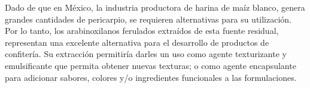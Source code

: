 Dado de que en México, la industria productora de harina de maíz blanco, genera grandes cantidades de pericarpio, se requieren alternativas para su utilización. Por lo tanto, los arabinoxilanos ferulados extraídos de esta fuente residual, representan una excelente alternativa para el desarrollo de productos de confitería. Su extracción permitiría darles un uso como agente texturizante y emulsificante que permita obtener nuevas texturas; o como agente encapsulante para adicionar sabores, colores y/o ingredientes funcionales a las formulaciones.

